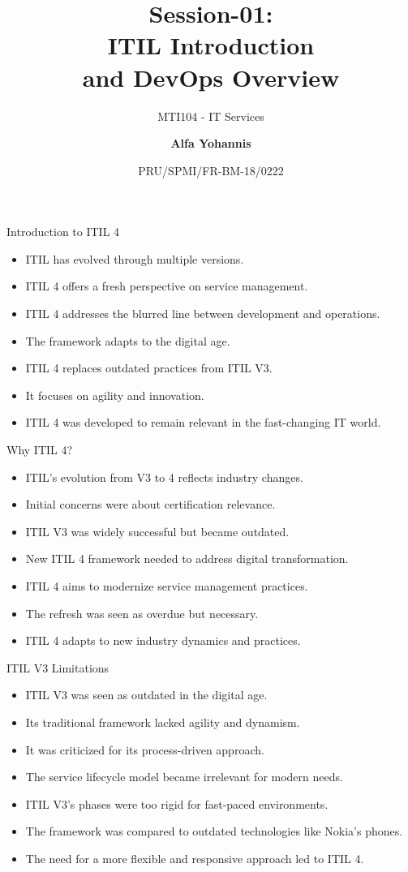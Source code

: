 \documentclass[aspectratio=169, table]{beamer}
\subtitle{MTI104 - IT Services}
\title{Session-01:\\\LARGE{ITIL Introduction\\and DevOps Overview}}
\date[Serial]{\scriptsize {PRU/SPMI/FR-BM-18/0222}}
\author[Pradita]{\small{\textbf{Alfa Yohannis}}}
\begin{document}
\frame{\titlepage}

\begin{frame}{Introduction to ITIL 4}
	\begin{itemize}
		\item ITIL has evolved through multiple versions.
		\item ITIL 4 offers a fresh perspective on service management.
		\item ITIL 4 addresses the blurred line between development and operations.
		\item The framework adapts to the digital age.
		\item ITIL 4 replaces outdated practices from ITIL V3.
		\item It focuses on agility and innovation.
		\item ITIL 4 was developed to remain relevant in the fast-changing IT world.
	\end{itemize}
\end{frame}

\begin{frame}{Why ITIL 4?}
	\begin{itemize}
		\item ITIL's evolution from V3 to 4 reflects industry changes.
		\item Initial concerns were about certification relevance.
		\item ITIL V3 was widely successful but became outdated.
		\item New ITIL 4 framework needed to address digital transformation.
		\item ITIL 4 aims to modernize service management practices.
		\item The refresh was seen as overdue but necessary.
		\item ITIL 4 adapts to new industry dynamics and practices.
	\end{itemize}
\end{frame}

\begin{frame}{ITIL V3 Limitations}
	\begin{itemize}
		\item ITIL V3 was seen as outdated in the digital age.
		\item Its traditional framework lacked agility and dynamism.
		\item It was criticized for its process-driven approach.
		\item The service lifecycle model became irrelevant for modern needs.
		\item ITIL V3's phases were too rigid for fast-paced environments.
		\item The framework was compared to outdated technologies like Nokia's phones.
		\item The need for a more flexible and responsive approach led to ITIL 4.
	\end{itemize}
\end{frame}
\end{document}
